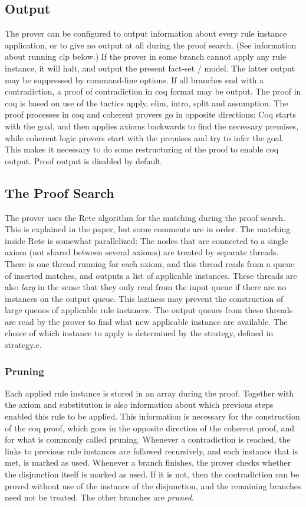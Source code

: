 \documentclass[a4paper]{article}
\begin{document}
\subsection{Output}
The prover can be configured to output information about every rule instance application, or to give no output at all during the proof search. (See information about running clp below.) If the prover in some branch cannot apply any rule instance, it will halt, and output the present fact-set / model. The latter output may be suppressed by command-line options. If all branches end with a contradiction, a proof of contradiction in coq format may be output. The proof in coq is based on use of the tactics apply, elim, intro, split and assumption. The proof processes in coq and coherent provers go in opposite directions: Coq starts with the goal, and then applies axioms backwards to find the necessary premises, while coherent logic provers start with the premises and try to infer the goal. This makes it necessary to do some restructuring of the proof to enable coq output. Proof output is disabled by default.

\subsection{The Proof Search}
The prover uses the Rete algorithm for the matching during the proof search. This is explained in the paper, but some comments are in order. The matching inside Rete is somewhat parallelized: The nodes that are connected to a single axiom (not shared between several axioms) are treated by separate threads. There is one thread running for each axiom, and this thread reads from a queue of inserted matches, and outputs a list of applicable instances. These threads are also \emph{lazy} in the sense that they only read from the input queue if there are no instances on the output queue. This laziness may prevent the construction of large queues of applicable rule instances. The output queues from these threads are read by the prover to find what new applicable instance are available. The choice of which instance to apply is determined by the strategy, defined in strategy.c.

\subsubsection{Pruning}
Each applied rule instance is stored in an array during the proof. Together with the axiom and substitution is also information about which previous steps enabled this rule to be applied. This information is necessary for the construction of the coq proof, which goes in the opposite direction of the coherent proof, and for what is commonly called pruning. Whenever a contradiction is reached, the links to previous rule instances are followed recursively, and each instance that is met, is marked as used. Whenever a branch finishes, the prover checks whether the disjunction itself is marked as used. If it is not, then the contradiction can be proved without use of the instance of the disjunction, and the remaining branches need not be treated. The other branches are \emph{pruned}.
\end{document}

